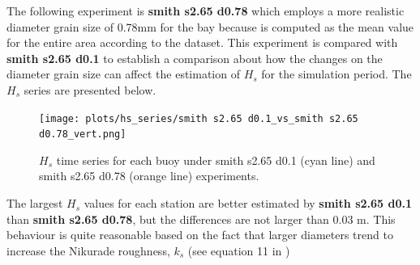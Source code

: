 \documentclass[12pt]{article}
\begin{document}
The following experiment is \textbf{smith s2.65 d0.78} which employs a more realistic diameter grain size of 0.78mm for the bay because is computed as the mean value for the entire area according to the dataset. This experiment is compared with \textbf{smith s2.65 d0.1} to establish a comparison about how the changes on the diameter grain size can affect the estimation of $H_s$ for the simulation period. The $H_s$ series are presented below.

\begin{figure}[H]
    \centering
    \texttt{[image: plots/hs\_series/smith s2.65 d0.1\_vs\_smith s2.65 d0.78\_vert.png]}
    \caption{$H_{s}$ time series for each buoy under smith s2.65 d0.1 (cyan line) and smith s2.65 d0.78 (orange line) experiments.}
    \label{fig:hs_smith_def_vs_smith_0.78}
\end{figure}

The largest $H_s$ values for each station are better estimated by \textbf{smith s2.65 d0.1} than \textbf{smith s2.65 d0.78}, but the differences are not larger than 0.03 m. This behaviour is quite reasonable based on the fact that larger diameters trend to increase the Nikurade roughness, $k_s$ (see equation 11 in \textcite{Smith2011})
\end{document}
